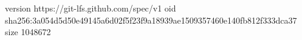 version https://git-lfs.github.com/spec/v1
oid sha256:3a054d5d50e49145a6d02f5f23f9a18939ae1509357460e140fb812f333dca37
size 1048672
